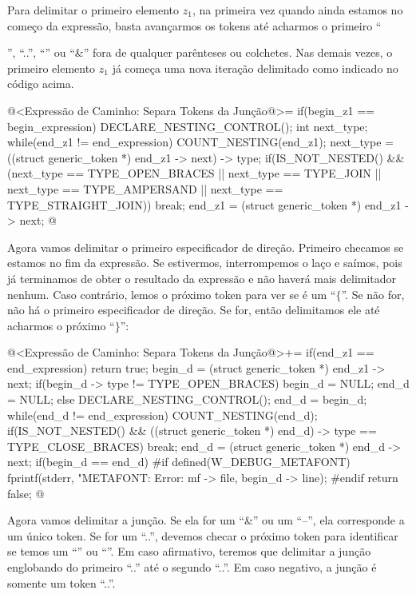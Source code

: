 Para delimitar o primeiro elemento $z_1$, na primeira vez quando ainda
estamos no começo da expressão, basta avançarmos os tokens até
acharmos o primeiro ``{'', ``..'', ``\-\-'' ou ``\&'' fora de qualquer
parênteses ou colchetes. Nas demais vezes, o primeiro elemento $z_1$
já começa uma nova iteração delimitado como indicado no código acima.

\iniciocodigo
@<Expressão de Caminho: Separa Tokens da Junção@>=
if(begin_z1 == begin_expression){
  DECLARE_NESTING_CONTROL();
  int next_type;
  while(end_z1 != end_expression){
    COUNT_NESTING(end_z1);
    next_type = ((struct generic_token *) end_z1 -> next) -> type;
    if(IS_NOT_NESTED() &&
       (next_type == TYPE_OPEN_BRACES || next_type == TYPE_JOIN ||
        next_type == TYPE_AMPERSAND || next_type == TYPE_STRAIGHT_JOIN))
      break;
    end_z1 = (struct generic_token *) end_z1 -> next;
  }
}
@
\fimcodigo

Agora vamos delimitar o primeiro especificador de direção. Primeiro
checamos se estamos no fim da expressão. Se estivermos, interrompemos
o laço e saímos, pois já terminamos de obter o resultado da expressão
e não haverá mais delimitador nenhum. Caso contrário, lemos o próximo
token para ver se é um ``$\{$''. Se não for, não há o primeiro
especificador de direção. Se for, então delimitamos ele até acharmos o
próximo ``$\}$'':

\iniciocodigo
@<Expressão de Caminho: Separa Tokens da Junção@>+=
if(end_z1 == end_expression)
  return true;
begin_d = (struct generic_token *) end_z1 -> next;
if(begin_d -> type != TYPE_OPEN_BRACES){
  begin_d = NULL;
  end_d = NULL;
}
else{
  DECLARE_NESTING_CONTROL();
  end_d = begin_d;
  while(end_d  != end_expression){
    COUNT_NESTING(end_d);
    if(IS_NOT_NESTED() &&
       ((struct generic_token *) end_d) -> type == TYPE_CLOSE_BRACES)
      break;
    end_d = (struct generic_token *) end_d -> next;
  }
  if(begin_d == end_d){
#if defined(W_DEBUG_METAFONT)
    fprintf(stderr, "METAFONT: Error: %
            mf -> file, begin_d -> line);
#endif
    return false;
  }
}
@
\fimcodigo

Agora vamos delimitar a junção. Se ela for um ``\&'' ou um ``--'', ela
corresponde a um único token. Se for um ``..'', devemos checar o
próximo token para identificar se temos um ``''
ou ``''. Em caso afirmativo, teremos que delimitar
a junção englobando do primeiro ``..'' até o segundo ``..''. Em caso
negativo, a junção é somente um token ``..''.

}
